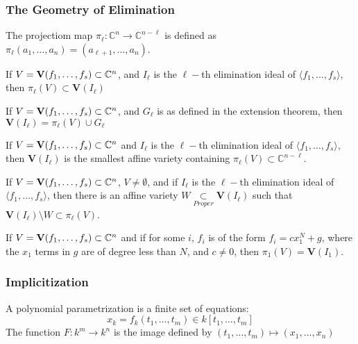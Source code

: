 \documentclass[../main.tex]{subfiles}
\begin{document}
\subsubsection{The Geometry of Elimination}
%
\begin{definition}
The projectiom map $\pi_{\ell}: \mathbb{C}^n \rightarrow \mathbb{C}^{n-\ell}$ is defined as $\pi_{\ell}(a_1,\hdots, a_n) = (a_{\ell+1},\hdots, a_n)$.
\end{definition}

\begin{theorem}
If $V=\textbf{V}(f_1,\hdots, f_s) \subset \mathbb{C}^n$, and $I_{\ell}$ is the $\ell-$th elimination ideal of $\langle f_1,\hdots, f_s\rangle$, then $\pi_{\ell}(V) \subset \textbf{V}(I_{\ell})$
\end{theorem}

\begin{theorem}
If $V = \textbf{V}(f_1,\hdots, f_s) \subset \mathbb{C}^n$, and $G_{\ell}$ is as defined in the extension theorem, then $\textbf{V}(I_{\ell}) = \pi_{\ell}(V)\cup G_{\ell}$
\end{theorem}

\begin{theorem}
If $V = \textbf{V}(f_1,\hdots, f_s) \subset \mathbb{C}^n$ and $I_{\ell}$ is the $\ell-$th elimination ideal of $\langle f_1,\hdots, f_s\rangle$, then $\textbf{V}(I_{\ell})$ is the smallest affine variety containing $\pi_{\ell}(V)\subset \mathbb{C}^{n-\ell}$.
\end{theorem}

\begin{theorem}
If $V = \textbf{V}(f_1,\hdots, f_s) \subset \mathbb{C}^n$, $V\ne \emptyset$, and if $I_{\ell}$ is the $\ell-$th elimination ideal of $\langle f_1,\hdots, f_s\rangle$, then there is an affine variety $W\underset{Proper}{\subset} \textbf{V}(I_{\ell})$ such that $\textbf{V}(I_{\ell})\setminus W \subset \pi_{\ell}(V)$.
\end{theorem}

\begin{theorem}
If $V = \textbf{V}(f_1,\hdots, f_s)\subset \mathbb{C}^n$ and if for some $i$, $f_i$ is of the form $f_i = cx_1^N + g$, where the $x_1$ terms in $g$ are of degree less than $N$, and $c\ne 0$, then $\pi_{1}(V) = \textbf{V}(I_{1})$.
\end{theorem}
%
\subsubsection{Implicitization}
%
\begin{definition}
A polynomial parametrization is a finite set of equations:
%
\begin{equation*}
    x_k = f_k(t_1,\hdots, t_m)\in k[t_1,\hdots, t_m]    
\end{equation*}
%
The function $F:k^m\rightarrow k^n$ is the image defined by $(t_1,\hdots, t_m)\mapsto (x_1,\hdots, x_n)$
\end{definition}
\end{document}
